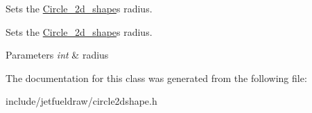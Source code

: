 Sets the \hyperlink{classjetfuel_1_1draw_1_1Circle__2d__shape}{Circle\+\_\+2d\+\_\+shape}\textquotesingle{}s radius. 

Sets the \hyperlink{classjetfuel_1_1draw_1_1Circle__2d__shape}{Circle\+\_\+2d\+\_\+shape}\textquotesingle{}s radius.


\begin{DoxyParams}{Parameters}
{\em int} & radius \\
\hline
\end{DoxyParams}


The documentation for this class was generated from the following file\+:\begin{DoxyCompactItemize}
\item 
include/jetfueldraw/circle2dshape.\+h\end{DoxyCompactItemize}
